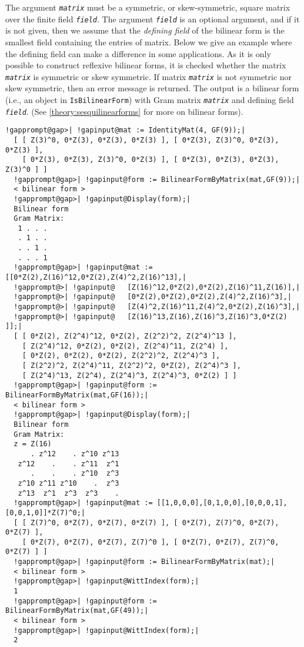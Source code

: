 \documentclass[a4paper,11pt]{report}
\begin{document}
{{{ The argument \mbox{\texttt{\mdseries\slshape matrix}} must be a symmetric, or skew-symmetric, square matrix over the finite field \mbox{\texttt{\mdseries\slshape field}}. The argument \mbox{\texttt{\mdseries\slshape field}} is an optional argument, and if it is not given, then we assume that the \emph{defining field} of the bilinear form is the smallest field containing the entries of matrix.
Below we give an example where the defining field can make a difference in
some applications. As it is only possible to construct reflexive bilinear
forms, it is checked whether the matrix \mbox{\texttt{\mdseries\slshape matrix}} is symmetric or skew symmetric. If matrix \mbox{\texttt{\mdseries\slshape matrix}} is not symmetric nor skew symmetric, then an error message is returned. The
output is a bilinear form (i.e., an object in \texttt{IsBilinearForm}) with Gram matrix \mbox{\texttt{\mdseries\slshape matrix}} and defining field \mbox{\texttt{\mdseries\slshape field}}. (See \ref{theory:sesquilinearforms} for more on bilinear forms). 
\begin{Verbatim}[commandchars=!@|,fontsize=\small,frame=single,label=Example]
  !gapprompt@gap>| !gapinput@mat := IdentityMat(4, GF(9));|
  [ [ Z(3)^0, 0*Z(3), 0*Z(3), 0*Z(3) ], [ 0*Z(3), Z(3)^0, 0*Z(3), 0*Z(3) ], 
    [ 0*Z(3), 0*Z(3), Z(3)^0, 0*Z(3) ], [ 0*Z(3), 0*Z(3), 0*Z(3), Z(3)^0 ] ]
  !gapprompt@gap>| !gapinput@form := BilinearFormByMatrix(mat,GF(9));|
  < bilinear form >
  !gapprompt@gap>| !gapinput@Display(form);|
  Bilinear form
  Gram Matrix:
   1 . . .
   . 1 . .
   . . 1 .
   . . . 1
  !gapprompt@gap>| !gapinput@mat := [[0*Z(2),Z(16)^12,0*Z(2),Z(4)^2,Z(16)^13],|
  !gapprompt@>| !gapinput@   [Z(16)^12,0*Z(2),0*Z(2),Z(16)^11,Z(16)],|
  !gapprompt@>| !gapinput@   [0*Z(2),0*Z(2),0*Z(2),Z(4)^2,Z(16)^3],|
  !gapprompt@>| !gapinput@   [Z(4)^2,Z(16)^11,Z(4)^2,0*Z(2),Z(16)^3],|
  !gapprompt@>| !gapinput@   [Z(16)^13,Z(16),Z(16)^3,Z(16)^3,0*Z(2) ]];|
  [ [ 0*Z(2), Z(2^4)^12, 0*Z(2), Z(2^2)^2, Z(2^4)^13 ], 
    [ Z(2^4)^12, 0*Z(2), 0*Z(2), Z(2^4)^11, Z(2^4) ], 
    [ 0*Z(2), 0*Z(2), 0*Z(2), Z(2^2)^2, Z(2^4)^3 ], 
    [ Z(2^2)^2, Z(2^4)^11, Z(2^2)^2, 0*Z(2), Z(2^4)^3 ], 
    [ Z(2^4)^13, Z(2^4), Z(2^4)^3, Z(2^4)^3, 0*Z(2) ] ]
  !gapprompt@gap>| !gapinput@form := BilinearFormByMatrix(mat,GF(16));|
  < bilinear form >
  !gapprompt@gap>| !gapinput@Display(form);|
  Bilinear form
  Gram Matrix:
  z = Z(16)
      . z^12    . z^10 z^13
   z^12    .    . z^11  z^1
      .    .    . z^10  z^3
   z^10 z^11 z^10    .  z^3
   z^13  z^1  z^3  z^3    .
  !gapprompt@gap>| !gapinput@mat := [[1,0,0,0],[0,1,0,0],[0,0,0,1],[0,0,1,0]]*Z(7)^0;|
  [ [ Z(7)^0, 0*Z(7), 0*Z(7), 0*Z(7) ], [ 0*Z(7), Z(7)^0, 0*Z(7), 0*Z(7) ], 
    [ 0*Z(7), 0*Z(7), 0*Z(7), Z(7)^0 ], [ 0*Z(7), 0*Z(7), Z(7)^0, 0*Z(7) ] ]
  !gapprompt@gap>| !gapinput@form := BilinearFormByMatrix(mat);|
  < bilinear form >
  !gapprompt@gap>| !gapinput@WittIndex(form);|
  1
  !gapprompt@gap>| !gapinput@form := BilinearFormByMatrix(mat,GF(49));|
  < bilinear form >
  !gapprompt@gap>| !gapinput@WittIndex(form);|
  2 
\end{Verbatim}
 }

}}
\end{document}
